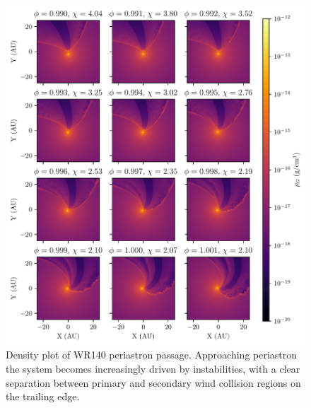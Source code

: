 \begin{figure}[p]
  \centering
  \includegraphics{assets/wr140-periastron/periastron-rho.pdf}
  \caption[Density plot of WR140 periastron passage]{Density plot of WR140 periastron passage. Approaching periastron the system becomes increasingly driven by instabilities, with a clear separation between primary and secondary wind collision regions on the trailing edge.}
\end{figure}

